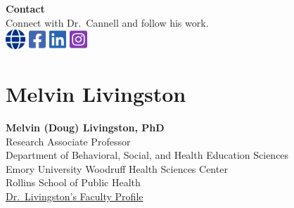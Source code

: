 \documentclass[
  letterpaper,
  DIV=11,
  numbers=noendperiod]{scrreprt}
\begin{document}
\textbf{Contact}\\
Connect with Dr.~Cannell and follow his work.\\
\includegraphics[width=2em,height=2em]{chapters/about_the_authors/about_the_authors_files/figure-pdf/fa-icon-a4a233699ebb8edeaca4e7ae0455099b.pdf}
\includegraphics[width=1.75em,height=2em]{chapters/about_the_authors/about_the_authors_files/figure-pdf/fa-icon-d19241927d9e636802f0f0caca52c0af.pdf}
\includegraphics[width=1.75em,height=2em]{chapters/about_the_authors/about_the_authors_files/figure-pdf/fa-icon-f2455331e499245af38ff1988a0023d4.pdf}
\includegraphics[width=1.75em,height=2em]{chapters/about_the_authors/about_the_authors_files/figure-pdf/fa-icon-1cbfc0b82b7e84c9b17b238bfd9a886e.pdf}

\section*{Melvin Livingston}\label{melvin-livingston}


\textbf{Melvin (Doug) Livingston, PhD}\\
Research Associate Professor\\
Department of Behavioral, Social, and Health Education Sciences\\
Emory University Woodruff Health Sciences Center\\
Rollins School of Public Health\\
\href{https://sph.emory.edu/faculty/profile/index.php?FID=melvin-livingston-8970}{Dr.~Livingston's
Faculty Profile}
\end{document}
